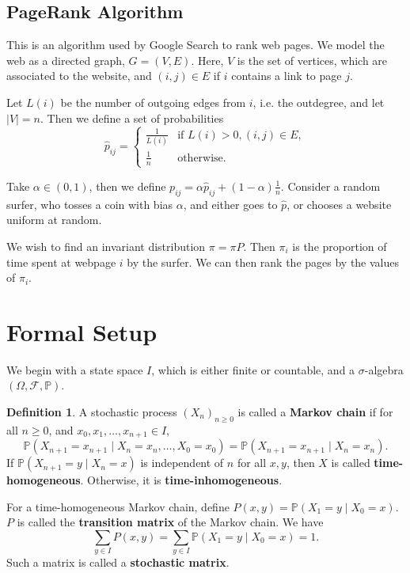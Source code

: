 \documentclass[12pt]{article}
\theoremstyle{definition}
\newtheorem{definition}{Definition}[section]
\theoremstyle{remark}
\begin{document}
\subsection{PageRank Algorithm}%
\label{sub:pagerank_algorithm}

This is an algorithm used by Google Search to rank web pages. We model the web as a directed graph, $G = (V, E)$. Here, $V$ is the set of vertices, which are associated to the website, and $(i, j) \in E$ if $i$ contains a link to page $j$.

Let $L(i)$ be the number of outgoing edges from $i$, i.e. the outdegree, and let $|V| = n$. Then we define a set of probabilities
\[
	\hat{p}_{ij} =
\begin{cases}
	\frac{1}{L(i)} & \text{if } L(i) > 0, (i, j) \in E, \\
	\frac{1}{n} & \text{otherwise}.
\end{cases}
\]

Take $\alpha \in (0,1)$, then we define $p_{ij} = \alpha \hat{p}_{ij} + (1 - \alpha) \frac{1}{n}$. Consider a random surfer, who tosses a coin with bias $\alpha$, and either goes to $\hat p$, or chooses a website uniform at random.

We wish to find an invariant distribution $\pi = \pi P$. Then $\pi_{i}$ is the proportion of time spent at webpage $i$ by the surfer. We can then rank the pages by the values of $\pi_{i}$.

\newpage

\section{Formal Setup}%
\label{sec:formal_setup}

We begin with a state space $I$, which is either finite or countable, and a $\sigma$-algebra $(\Omega, \mathcal{F}, \mathbb{P})$.

\begin{definition}
	A stochastic process $(X_n)_{n \geq 0}$ is called a \textbf{Markov chain} if for all $n \geq 0$, and $x_{0}, x_{1} ,\ldots, x_{n+1} \in I$,
	\[
		\mathbb{P}(X_{n+1} = x_{n+1} \mid X_{n} = x_{n}, \ldots, X_{0} = x_{0}) = \mathbb{P}(X_{n+1} = x_{n+1} \mid X_{n} = x_{n})
	.\]
	If $\mathbb{P}(X_{n+1} = y \mid X_{n} = x)$ is independent of $n$ for all $x, y$, then $X$ is called \textbf{time-homogeneous}. Otherwise, it is \textbf{time-inhomogeneous}.

	For a time-homogeneous Markov chain, define $P(x, y) = \mathbb{P}(X_1 = y \mid X_0 = x)$. $P$ is called the \textbf{transition matrix} of the Markov chain. We have
	\[
		\sum_{y \in I} P(x, y) = \sum_{y \in I} \mathbb{P}(X_1 = y \mid X_0 = x) = 1
	.\]
	Such a matrix is called a \textbf{stochastic matrix}.
\end{definition}
\end{document}
